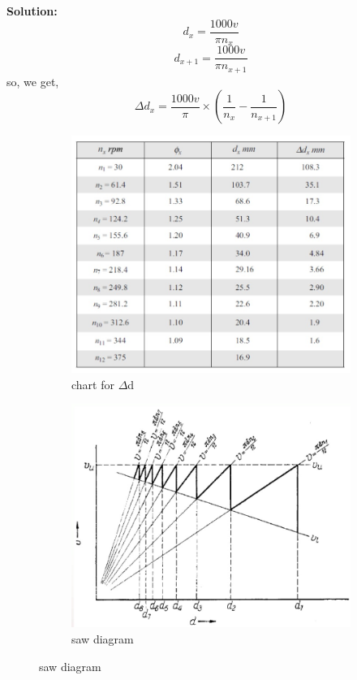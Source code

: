 \documentclass{article}
\begin{document}
\textbf{Solution:}\\
$$d_x = \frac{1000 v}{\pi n_x}$$
$$d_{x+1} = \frac{1000 v}{\pi n_{x+1}}$$
so, we get,
$$\Delta d_x = \frac{1000 v}{\pi} \times \left(\frac{1}{n_x} - \frac{1}{n_{x+1}}\right) $$

\begin{figure}[h]
  \centering

  \begin{subfigure}{0.48\textwidth}
    \centering
    \includegraphics[width=\linewidth]{img/ap_table.jpeg}
    \caption{chart for $\Delta$d}
  \end{subfigure}
  \hfill
  \begin{subfigure}{0.48\textwidth}
    \centering
    \includegraphics[width=\linewidth]{img/saw_dia_ap.jpeg}
    \caption{saw diagram}
    \label{fig:saw diagram of AP}
  \end{subfigure}
\end{figure}
\end{document}
